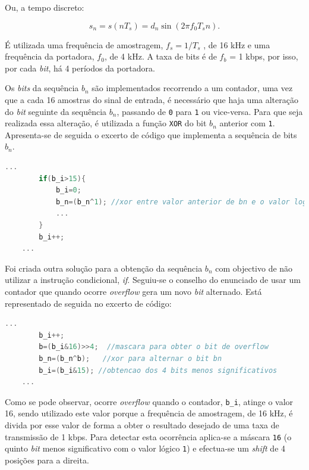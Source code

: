 \documentclass[11pt]{article}
\numberwithin{equation}{section}
\begin{document}
Ou, a tempo discreto:

\vspace{-3mm}
\begin{equation}
	s_{n} = s(n T_s) = d_n \sin (2\pi f_0 T_s n).
\end{equation} 

\vspace{1mm}
É utilizada uma frequência de amostragem, $f_s=1/T_s$ , de 16 kHz e uma frequência da portadora, $f_0$, de 4 kHz. A taxa de bits é de $f_b$ = 1 kbps, por isso, por cada \textit{bit}, há 4 períodos da portadora.  

Os \textit{bits} da sequência $b_n$ são implementados recorrendo a um contador, uma vez que a cada 16 amostras do sinal de entrada, é necessário que haja uma alteração do \textit{bit} seguinte da sequência $b_n$, passando de \texttt{0} para \texttt{1} ou vice-versa. Para que seja realizada essa alteração, é utilizada a função \texttt{XOR} do bit $b_n$ anterior com \texttt{1}. Apresenta-se de seguida o excerto de código que implementa a sequência de bits $b_n$. 

\begin{lstlisting}[language=C]
	...
		if(b_i>15){
			b_i=0;
			b_n=(b_n^1); //xor entre valor anterior de bn e o valor logico 1
			...
		}
		b_i++;
	... 
\end{lstlisting}

Foi criada outra solução para a obtenção da sequência $b_n$ com objectivo de não utilizar a instrução condicional, \textit{if}. Seguiu-se o conselho do enunciado de usar um contador que quando ocorre \textit{overflow} gera um novo \textit{bit} alternado. Está representado de seguida no excerto de código:

\begin{lstlisting}[language=C]
	...
		b_i++;			
		b=(b_i&16)>>4;  //mascara para obter o bit de overflow
		b_n=(b_n^b);   //xor para alternar o bit bn
		b_i=(b_i&15); //obtencao dos 4 bits menos significativos
	...
\end{lstlisting}

Como se pode observar, ocorre \textit{overflow} quando o contador, \texttt{b\_i}, atinge o valor 16, sendo utilizado este valor porque a frequência de amostragem, de 16 kHz, é divida por esse valor de forma a obter o resultado desejado de uma taxa de transmissão de 1 kbps. Para detectar esta ocorrência aplica-se a máscara \texttt{16} (o quinto \textit{bit} menos significativo com o valor lógico \texttt{1}) e efectua-se um \textit{shift} de 4 posições para a direita.
\end{document}
